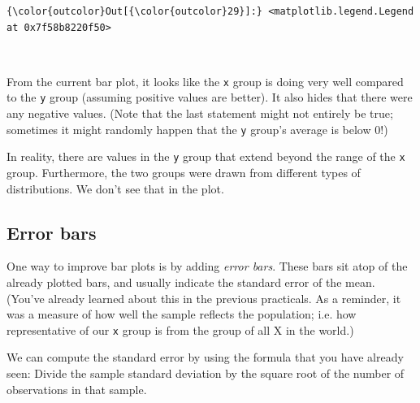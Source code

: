 \documentclass[11pt]{article}
\begin{document}
\begin{Verbatim}[commandchars=\\\{\}]
{\color{outcolor}Out[{\color{outcolor}29}]:} <matplotlib.legend.Legend at 0x7f58b8220f50>
\end{Verbatim}
            
    \begin{center}
    \end{center}
    { \hspace*{\fill} \\}
    
    From the current bar plot, it looks like the \texttt{x} group is doing
very well compared to the \texttt{y} group (assuming positive values are
better). It also hides that there were any negative values. (Note that
the last statement might not entirely be true; sometimes it might
randomly happen that the \texttt{y} group's average is below 0!)

In reality, there are values in the \texttt{y} group that extend beyond
the range of the \texttt{x} group. Furthermore, the two groups were
drawn from different types of distributions. We don't see that in the
plot.

    \subsection{Error bars}\label{error-bars}

One way to improve bar plots is by adding \emph{error bars}. These bars
sit atop of the already plotted bars, and usually indicate the standard
error of the mean. (You've already learned about this in the previous
practicals. As a reminder, it was a measure of how well the sample
reflects the population; i.e. how representative of our \texttt{x} group
is from the group of all X in the world.)

We can compute the standard error by using the formula that you have
already seen: Divide the sample standard deviation by the square root of
the number of observations in that sample.
\end{document}
